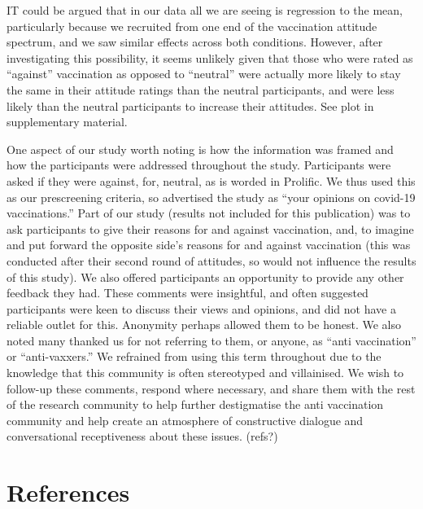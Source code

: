 \documentclass[
  english,
  ,jou,floatsintext]{apa6}
\begin{document}
IT could be argued that in our data all we are seeing is regression to the mean, particularly because we recruited from one end of the vaccination attitude spectrum, and we saw similar effects across both conditions. However, after investigating this possibility, it seems unlikely given that those who were rated as ``against'' vaccination as opposed to ``neutral'' were actually more likely to stay the same in their attitude ratings than the neutral participants, and were less likely than the neutral participants to increase their attitudes. See plot in supplementary material.

One aspect of our study worth noting is how the information was framed and how the participants were addressed throughout the study. Participants were asked if they were against, for, neutral, as is worded in Prolific. We thus used this as our prescreening criteria, so advertised the study as ``your opinions on covid-19 vaccinations.'' Part of our study (results not included for this publication) was to ask participants to give their reasons for and against vaccination, and, to imagine and put forward the opposite side's reasons for and against vaccination (this was conducted after their second round of attitudes, so would not influence the results of this study). We also offered participants an opportunity to provide any other feedback they had. These comments were insightful, and often suggested participants were keen to discuss their views and opinions, and did not have a reliable outlet for this. Anonymity perhaps allowed them to be honest. We also noted many thanked us for not referring to them, or anyone, as ``anti vaccination'' or ``anti-vaxxers.'' We refrained from using this term throughout due to the knowledge that this community is often stereotyped and villainised. We wish to follow-up these comments, respond where necessary, and share them with the rest of the research community to help further destigmatise the anti vaccination community and help create an atmosphere of constructive dialogue and conversational receptiveness about these issues. (refs?)

\hypertarget{references}{%
\section*{References}\label{references}}
\end{document}
